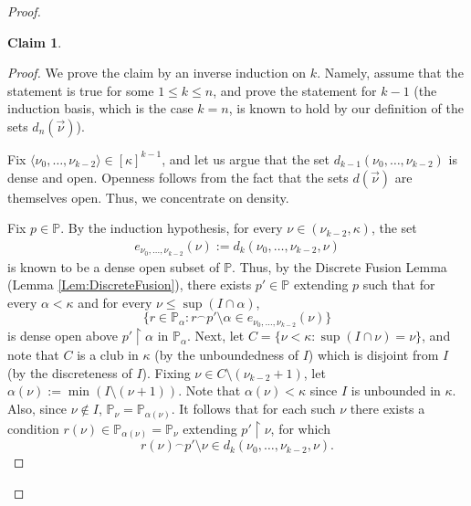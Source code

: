 \documentclass{article}
\theoremstyle{definition}
\theoremstyle{plain}
\newtheorem{claim}[definition]{Claim}
\newcommand{\po}{\mathbb{P}}
\newcommand{\la}{\langle}
\newcommand{\ra}{\rangle}
\newcommand{\uhr}{\upharpoonright}
\begin{document}
\begin{proof}
\begin{claim}
    \end{claim}
    \begin{proof}
        We prove the claim by an inverse induction on $k$. Namely,  assume that the statement is true for some $1\leq k\leq n$, and prove the statement for $k-1$ (the induction basis, which is the case $k=n$, is known to hold by our definition of the sets $d_n(\vec{\nu})$). 

        Fix $\la \nu_0,\ldots, \nu_{k-2}\ra\in [\kappa]^{k-1} $, and let us argue that the set $d_{k-1}(\nu_0,\ldots, \nu_{k-2})$ is dense and open. Openness follows from the fact that the sets $d(\vec{\nu})$ are themselves open. Thus, we concentrate on density. 
        
        Fix $p\in \po$. By the induction hypothesis, for every $\nu\in (\nu_{k-2}, \kappa)$, the set
        \begin{align*}
            e_{\nu_0,\ldots, \nu_{k-2}}(\nu):= d_{k}(\nu_0,\ldots, \nu_{k-2}, \nu)
        \end{align*}
        is known to be a dense open subset of $\po$. Thus, by the Discrete Fusion Lemma (Lemma \ref{Lem:DiscreteFusion}), there exists $p'\in \po$ extending $p$ such that for every $\alpha<\kappa$ and for every $\nu \leq \sup(I\cap \alpha)$,
        $$ \{ r\in \po_\alpha \colon r{}^\frown p'\setminus \alpha\in e_{\nu_0,\ldots, \nu_{k-2}}(\nu) \} $$
        is dense open above $p'\uhr \alpha$ in $\po_\alpha$. Next, let $C = \{ \nu<\kappa \colon \sup(I\cap \nu) = \nu \} $, and note that $C$ is a club in $\kappa$ (by the unboundedness of $I$) which is disjoint from $I$ (by the discreteness of $I$). Fixing $\nu\in C\setminus (\nu_{k-2}+1)$, let $\alpha(\nu):= \min(I\setminus (\nu+1))$. Note that $\alpha(\nu)<\kappa$ since $I$ is unbounded in $\kappa$. Also, since $\nu\notin I$, $\po_\nu = \po_{\alpha(\nu)}$. It follows that for each such $\nu$ there exists a condition $r(\nu)\in \po_{\alpha(\nu)} = \po_{\nu}$ extending $p'\uhr \nu$,  for which 
        $$ r(\nu){}^\frown p'\setminus \nu\in d_{k}{(\nu_0,\ldots, \nu_{k-2},\nu)}. $$


\end{proof}
\end{proof}
\end{document}
